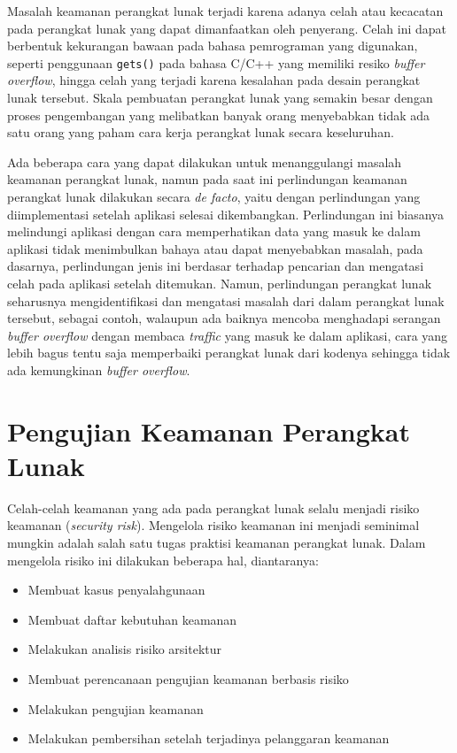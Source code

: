 Masalah keamanan perangkat lunak terjadi karena adanya celah atau kecacatan pada perangkat lunak yang dapat
dimanfaatkan oleh penyerang. Celah ini dapat berbentuk kekurangan bawaan pada bahasa pemrograman yang digunakan,
seperti penggunaan \texttt{gets()} pada bahasa C/C++ yang memiliki resiko \emph{buffer overflow},
hingga celah yang terjadi
karena kesalahan pada desain perangkat lunak tersebut. Skala pembuatan perangkat lunak yang semakin besar
dengan proses pengembangan yang melibatkan banyak orang menyebabkan tidak ada satu orang yang paham
cara kerja perangkat lunak secara keseluruhan.

Ada beberapa cara yang dapat dilakukan untuk menanggulangi masalah keamanan perangkat lunak,
namun pada saat ini perlindungan keamanan perangkat lunak dilakukan secara \emph{de facto},
yaitu dengan perlindungan yang diimplementasi setelah aplikasi selesai dikembangkan.
Perlindungan ini biasanya melindungi aplikasi dengan cara memperhatikan data yang masuk
ke dalam aplikasi tidak menimbulkan bahaya atau dapat menyebabkan masalah, pada dasarnya,
perlindungan jenis ini berdasar terhadap pencarian dan mengatasi celah pada aplikasi setelah ditemukan.
Namun, perlindungan perangkat lunak seharusnya mengidentifikasi dan mengatasi masalah dari
dalam perangkat lunak tersebut, sebagai contoh, walaupun ada baiknya mencoba menghadapi serangan
\emph{buffer overflow} dengan membaca \emph{traffic} yang masuk ke dalam aplikasi,
cara yang lebih bagus tentu saja memperbaiki perangkat lunak dari kodenya sehingga
tidak ada kemungkinan \emph{buffer overflow}.

\section{Pengujian Keamanan Perangkat Lunak}

Celah-celah keamanan yang ada pada perangkat lunak selalu menjadi risiko keamanan (\emph{security risk}).
Mengelola risiko keamanan ini menjadi seminimal mungkin adalah salah satu tugas praktisi keamanan perangkat lunak.
Dalam mengelola risiko ini dilakukan beberapa hal, diantaranya:

\begin{itemize}
    \item Membuat kasus penyalahgunaan
    \item Membuat daftar kebutuhan keamanan
    \item Melakukan analisis risiko arsitektur
    \item Membuat perencanaan pengujian keamanan berbasis risiko
    \item Melakukan pengujian keamanan
    \item Melakukan pembersihan setelah terjadinya pelanggaran keamanan
\end{itemize}

